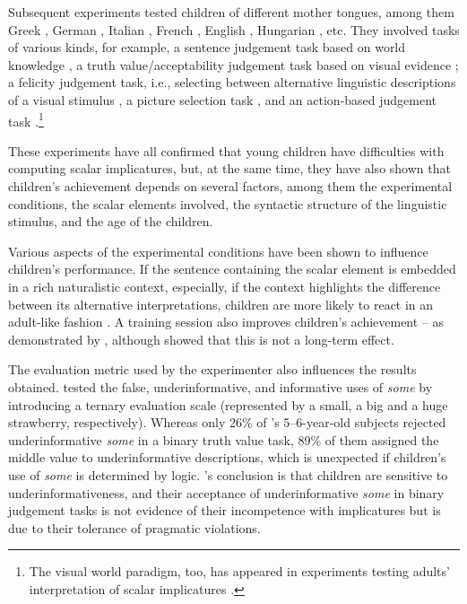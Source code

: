 \documentclass[output=paper]{langscibook}
\begin{document}
Subsequent experiments tested children of different mother tongues, among them Greek \citep{papafragou2003scalar,papafragou2004children}, German \citep{doitchinov2005children}, Italian \citep{guasti2005children,foppolo2012scalar}, French \citep{noveck2001children,pouscoulous2007developmental}, English \citep{chierchia2001acquisition,chierchia2004semantic,papafragouskordos16}, Hungarian \citep{ekisszt18}, etc. They involved tasks of various kinds, for example, a sentence judgement task based on world knowledge \citep[e.g.][]{smith1980quantifiers,noveck2001children}, a truth value/acceptability judgement task based on visual evidence \citep{papafragou2003scalar,pouscoulous2007developmental}; a felicity judgement task, i.e., selecting between alternative linguistic descriptions of a visual stimulus \citep{chierchia2001acquisition,foppolo2012scalar}, a picture selection task \citep{doitchinov2005children}, and an action-based judgement task \citep{papafragou2004children}.\footnote{The visual world paradigm, too, has appeared in experiments testing adults' interpretation of scalar implicatures \citep[see, e.g.,][]{huang2009online,grodner2010some,degen2016availability}.}

These experiments have all confirmed that young children have difficulties with computing scalar implicatures, but, at the same time, they have also shown that children's achievement depends on several factors, among them the experimental conditions, the scalar elements involved, the syntactic structure of the linguistic stimulus, and the age of the children.

Various aspects of the experimental conditions have been shown to influence children's performance. If the sentence containing the scalar element is embedded in a rich naturalistic context, especially, if the context highlights the difference between its alternative interpretations, children are more likely to react in an adult-like fashion \citep{papafragou2003scalar,papafragou2004children,foppolo2012scalar}. A training session also improves children’s achievement – as demonstrated by \citet{papafragou2003scalar}, although \citet{guasti2005children} showed that this is not a long-term effect.

The evaluation metric used by the experimenter also influences the results obtained. \citet{katsos2011pragmatic} tested the false, underinformative, and informative uses of \textit{some} by introducing a ternary evaluation scale (represented by a small, a big and a huge strawberry, respectively). Whereas only 26\% of \citeauthor{katsos2011pragmatic}'s 5--6-year-old subjects rejected underinformative \textit{some} in a binary truth value task, 89\% of them assigned the middle value to underinformative descriptions, which is unexpected if children’s use of \textit{some} is determined by logic. \citeauthor{katsos2011pragmatic}'s conclusion is that children are sensitive to underinformativeness, and their acceptance of underinformative \textit{some} in binary judgement tasks is not evidence of their incompetence with implicatures but is due to their tolerance of pragmatic violations.
\end{document}
